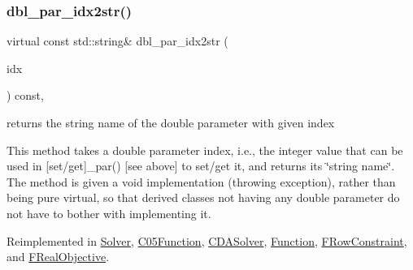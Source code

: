 \mbox{\label{class_s_m_spp__di__unipi__it_1_1_thin_compute_interface_a1be0e4ca13f9253674bc4fa7b67fe40e}} 
\subsubsection{\texorpdfstring{dbl\+\_\+par\+\_\+idx2str()}{dbl\_par\_idx2str()}}
{\footnotesize\ttfamily virtual const std\+::string\& dbl\+\_\+par\+\_\+idx2str (\begin{DoxyParamCaption}\item[{const \mbox{\hyperlink{class_s_m_spp__di__unipi__it_1_1_thin_compute_interface_aa3d710629ad8c434286726ad810c3b47}{idx\+\_\+type}}}]{idx }\end{DoxyParamCaption}) const\hspace{0.3cm}{\ttfamily [inline]}, {\ttfamily [virtual]}}



returns the string name of the double parameter with given index 

This method takes a double parameter index, i.\+e., the integer value that can be used in \mbox{[}set/get\mbox{]}\+\_\+par() \mbox{[}see above\mbox{]} to set/get it, and returns its \char`\"{}string name\char`\"{}. The method is given a void implementation (throwing exception), rather than being pure virtual, so that derived classes not having any double parameter do not have to bother with implementing it. 

Reimplemented in \mbox{\hyperlink{class_s_m_spp__di__unipi__it_1_1_solver_a93f1297e7910e91cc18b303376191026}{Solver}}, \mbox{\hyperlink{class_s_m_spp__di__unipi__it_1_1_c05_function_a93f1297e7910e91cc18b303376191026}{C05\+Function}}, \mbox{\hyperlink{class_s_m_spp__di__unipi__it_1_1_c_d_a_solver_a93f1297e7910e91cc18b303376191026}{C\+D\+A\+Solver}}, \mbox{\hyperlink{class_s_m_spp__di__unipi__it_1_1_function_a93f1297e7910e91cc18b303376191026}{Function}}, \mbox{\hyperlink{class_s_m_spp__di__unipi__it_1_1_f_row_constraint_a93f1297e7910e91cc18b303376191026}{F\+Row\+Constraint}}, and \mbox{\hyperlink{class_s_m_spp__di__unipi__it_1_1_f_real_objective_a93f1297e7910e91cc18b303376191026}{F\+Real\+Objective}}.

